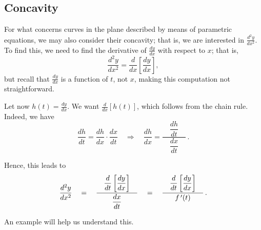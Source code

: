 \subsection{Concavity}
 \ifcourse
 	\checkoddpage
{}
 \fi
For what concerns curves in the plane described by means of parametric equations, we may also  consider their concavity; that is, we are interested in $\frac{d^2y}{dx^2}$. To find this, we need to find the derivative of $\frac{dy}{dx}$ with respect to $x$; that is,  $$\frac{d^2y}{dx^2}=\frac{d}{dx}\left[\frac{dy}{dx}\right],$$ but recall that $\frac{dy}{dx}$ is a function of $t$, not $x$, making this computation not straightforward. 

Let now $h(t) = \frac{dy}{dx}$. We want $\frac{d}{dx}[h(t)]$, which follows from the chain rule. Indeed, we have
$$\frac{dh}{dt} = \frac{dh}{dx}\cdot\frac{dx}{dt} \quad \Rightarrow \quad \frac{dh}{dx} = \frac{\quad\dfrac{dh}{dt}\quad}{\dfrac{dx}{dt}}\,.$$

Hence, this leads to
\begin{equation}
\frac{d^2y}{dx^2}\quad = \quad\frac{\quad\dfrac{d}{dt}\left[\dfrac{dy}{dx}\right]\quad}{\dfrac{dx}{dt}} \quad=\quad\frac{\quad\dfrac{d}{dt}\left[\dfrac{dy}{dx}\right]\quad}{f\,'(t)}\,.
\label{idea:second_der_par}
\end{equation}


An example will help us understand this.

